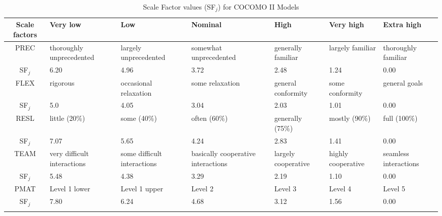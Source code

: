 \begingroup
\captionsetup{skip=10pt}
\setlength{\LTleft}{-1.7cm plus -1fill}
\setlength{\LTright}{\LTleft}
\vspace*{0.4cm}
\begin{longtable}{|c|p{2cm}|p{2cm}|p{2cm}|p{2cm}|p{2cm}|p{2cm}|}
	\hline
	Scale factors & Very low & Low & Nominal & High & Very high & Extra high \\
	\hline
	PREC & thoroughly unprecedented & largely unprecedented & somewhat unprecedented & generally familiar & largely familiar & thoroughly familiar \\
	SF\(_j\) & 6.20 & 4.96 & 3.72 & 2.48 & 1.24 & 0.00 \\
	\hline
	FLEX & rigorous & occasional relaxation & some relaxation & general conformity & some conformity & general goals \\
	SF\(_j\) & 5.0 & 4.05 & 3.04 & 2.03 & 1.01 & 0.00 \\
	\hline
	RESL & little (20\%) & some (40\%) & often (60\%) & generally (75\%) & mostly (90\%) & full (100\%) \\
	SF\(_j\) & 7.07 & 5.65 & 4.24 & 2.83 & 1.41 & 0.00 \\
	\hline
	TEAM & very difficult interactions & some difficult interactions & basically cooperative interactions & largely cooperative & highly cooperative & seamless interactions \\
	SF\(_j\) & 5.48 & 4.38 & 3.29 & 2.19 & 1.10 & 0.00 \\
	\hline
	PMAT & Level 1 lower & Level  1 upper & Level 2 & Level 3 & Level 4  & Level 5 \\
	SF\(_j\) & 7.80 & 6.24 & 4.68 & 3.12 & 1.56 & 0.00 \\
	\hline
	
	\caption{Scale Factor values (SF\(_j\)) for COCOMO II Models}
\end{longtable}
\endgroup


